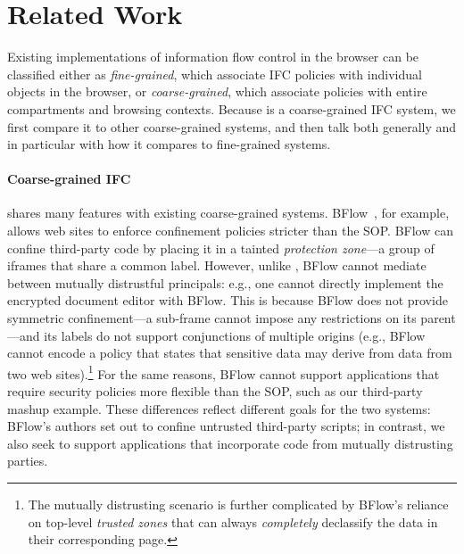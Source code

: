 \section{Related Work}
\label{sec:related}

Existing implementations of information flow control in the browser can
be classified either as \emph{fine-grained}, which associate IFC
policies with individual objects in the browser, or
\emph{coarse-grained}, which associate policies with
entire compartments and browsing contexts.  Because \sys{} is a
coarse-grained IFC system, we first compare it to other coarse-grained
systems, and then talk both generally and in particular with how
it compares to fine-grained systems.

\paragraph{Coarse-grained IFC} \sys{} shares many features
with existing coarse-grained systems.
%
BFlow~\cite{Yip:2009:PBS}, for example, allows web sites to enforce confinement policies
stricter than the SOP\@.
%
BFlow can confine third-party code by placing
it in a tainted \emph{protection zone}---a group
of iframes that share a common label.
%
However, unlike \sys{}, BFlow cannot mediate between mutually
distrustful principals: e.g., one cannot directly implement the
encrypted document editor with BFlow.
%
This is because BFlow does not provide symmetric confinement---a
sub-frame cannot impose any restrictions on its parent---and its
labels do not support conjunctions of multiple origins (e.g., BFlow
cannot encode a policy that states that sensitive data may derive from
data from two web sites).\footnote{ The mutually distrusting scenario
  is further complicated by BFlow's reliance on top-level
  \emph{trusted zones} that can always \emph{completely} declassify
  the data in their corresponding page.}
%
For the same reasons, BFlow cannot support applications that require
security policies more flexible than the SOP, such as our third-party
mashup example.
%
These differences reflect different goals for the two systems: BFlow's
authors set out to confine untrusted third-party scripts; in contrast,
we also seek to support applications that incorporate code from mutually
distrusting parties.


